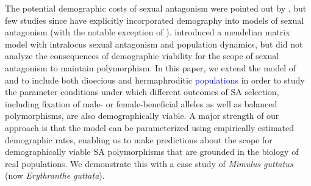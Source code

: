 \documentclass[11pt]{article}
\begin{document}
The potential demographic costs of sexual antagonism were pointed out by \cite{kokko2003sexy}, but few studies since have explicitly incorporated demography into models of sexual antagonism (with the notable exception of \citealt{harts2014demography}). \citet{deVriesCaswell2019a} introduced a mendelian matrix model with intralocus sexual antagonism and population dynamics, but did not analyze the consequences of demographic viability for the scope of sexual antagonism to maintain polymorphism. In this paper, we extend the model of \citet{deVriesCaswell2019a} and \citet{deVriesCaswell2019b} to include both dioecious and hermaphroditic \textcolor{blue}{populations} in order to study the parameter conditions under which different outcomes of SA selection, including fixation of male- or female-beneficial alleles as well as balanced polymorphisms, are also demographically viable. A major strength of our approach is that the model can be parameterized using empirically estimated demographic rates, enabling us to make predictions about the scope for demographically viable SA polymorphisms that are grounded in the biology of real populations. We demonstrate this with a case study of {\itshape Mimulus guttatus} (now {\itshape Erythranthe guttata}).





\end{document}

